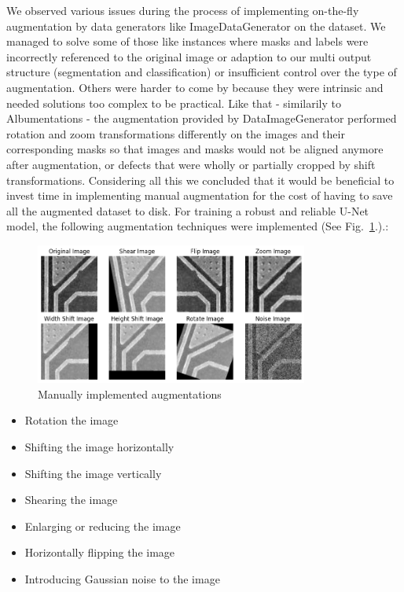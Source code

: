 \documentclass[12pt]{article}
\begin{document}
We observed various issues during the process of implementing on-the-fly augmentation by data generators like ImageDataGenerator on the dataset. We managed to solve some of those like instances where masks and labels were incorrectly referenced to the original image or adaption to our multi output structure (segmentation and classification) or insufficient control over the type of augmentation.  Others were harder to come by because they were intrinsic and needed solutions too complex to be practical. Like that - similarily to Albumentations - the  augmentation provided by DataImageGenerator performed rotation and zoom transformations differently on the images and their corresponding masks so that images and masks would not be aligned anymore after augmentation, or defects that were wholly or partially cropped by shift transformations. Considering all this we concluded that it would be beneficial to invest time in implementing manual augmentation for the cost of having to save all the augmented dataset to disk. For training a robust and reliable U-Net model, the following augmentation techniques were implemented (See Fig.~\ref{fig:manual_augmentation}.).:
\begin{figure}[h]
    \centering
    \includegraphics[width=0.8\textwidth]{./graphics/manual augmentation.png}
    \caption{Manually implemented augmentations}
    \label{fig:manual_augmentation}
\end{figure}

\begin{itemize}
    \item Rotation the image 
    \item Shifting the image horizontally  
    \item Shifting the image vertically  
    \item Shearing the image
    \item Enlarging or reducing  the image
    \item Horizontally flipping the image 
    \item Introducing Gaussian noise to the image
\end{itemize}
\end{document}

